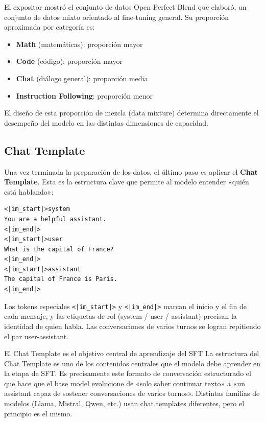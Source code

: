 \documentclass[a4paper]{article}
\begin{document}
El expositor mostró el conjunto de datos Open Perfect Blend que elaboró, un conjunto de datos mixto orientado al fine-tuning general. Su proporción aproximada por categoría es:

\begin{itemize}
    \item \textbf{Math} (matemáticas): proporción mayor
    \item \textbf{Code} (código): proporción mayor
    \item \textbf{Chat} (diálogo general): proporción media
    \item \textbf{Instruction Following}: proporción menor
\end{itemize}

El diseño de esta proporción de mezcla (data mixture) determina directamente el desempeño del modelo en las distintas dimensiones de capacidad.

\subsection{Chat Template}

Una vez terminada la preparación de los datos, el último paso es aplicar el \textbf{Chat Template}. Esta es la estructura clave que permite al modelo entender «quién está hablando»:

\begin{lstlisting}[caption={Ejemplo de Chat Template (formato ChatML)}]
<|im_start|>system
You are a helpful assistant.
<|im_end|>
<|im_start|>user
What is the capital of France?
<|im_end|>
<|im_start|>assistant
The capital of France is Paris.
<|im_end|>
\end{lstlisting}

Los tokens especiales \texttt{<|im\_start|>} y \texttt{<|im\_end|>} marcan el inicio y el fin de cada mensaje, y las etiquetas de rol (system / user / assistant) precisan la identidad de quien habla. Las conversaciones de varios turnos se logran repitiendo el par user-assistant.

\begin{importantbox}{El Chat Template es el objetivo central de aprendizaje del SFT}
La estructura del Chat Template es uno de los contenidos centrales que el modelo debe aprender en la etapa de SFT. Es precisamente este formato de conversación estructurado el que hace que el base model evolucione de «solo saber continuar texto» a «un assistant capaz de sostener conversaciones de varios turnos». Distintas familias de modelos (Llama, Mistral, Qwen, etc.) usan chat templates diferentes, pero el principio es el mismo.
\end{importantbox}
\end{document}
